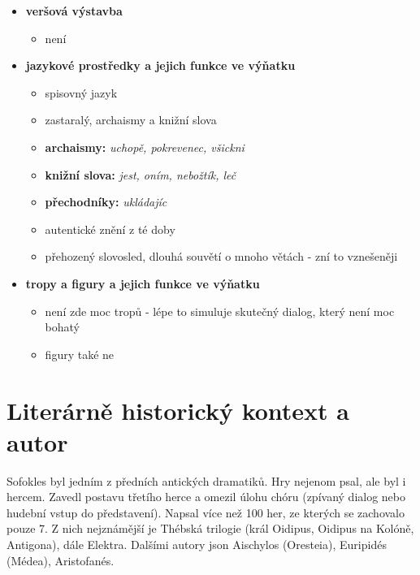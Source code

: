 \documentclass[11pt]{article}
\begin{document}
\begin{itemize}
\begin{itemize}
        \end{itemize}
        \item\textbf{veršová výstavba}
        \begin{itemize}
            \item není
        \end{itemize}
        \item\textbf{jazykové prostředky a jejich funkce ve výňatku}
        \begin{itemize}
            \item spisovný jazyk
            \item zastaralý, archaismy a knižní slova
            \item \textbf{archaismy: }\textit{uchopě, pokrevenec, všickni}
            \item \textbf{knižní slova: }\textit{jest, oním, nebožtík, leč}
            \item \textbf{přechodníky: }\textit{ukládajíc}
            \item autentické znění z té doby
            \item přehozený slovosled, dlouhá souvětí o mnoho větách - zní to vznešeněji
        \end{itemize}
        \item\textbf{tropy a figury a jejich funkce ve výňatku}
        \begin{itemize}
            \item není zde moc tropů - lépe to simuluje skutečný dialog, který není moc bohatý
            \item figury také ne
        \end{itemize}
    \end{itemize}
    \section*{Literárně historický kontext a autor}
    Sofokles byl jedním z předních antických dramatiků.
    Hry nejenom psal, ale byl i hercem.
    Zavedl postavu třetího herce a omezil úlohu chóru (zpívaný dialog nebo hudební vstup do představení).
    Napsal více než 100 her, ze kterých se zachovalo pouze 7. Z nich nejznámější je Thébská trilogie (král Oidipus, Oidipus na Kolóně, Antigona), dále Elektra.
    Dalšími autory json Aischylos (Oresteia), Euripidés (Médea), Aristofanés.
    
\end{document}
